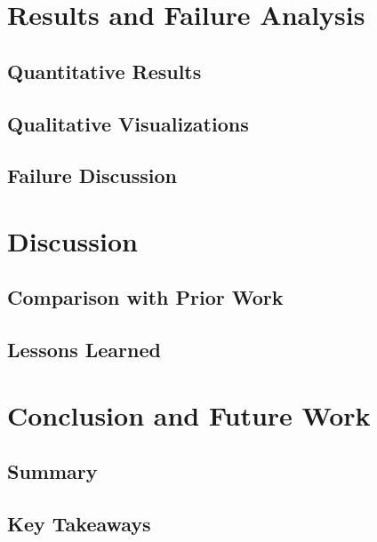 \documentclass[a4paper,12pt]{article}
\begin{document}
\section{Results and Failure Analysis}
\subsection{Quantitative Results}


\subsection{Qualitative Visualizations}


\subsection{Failure Discussion}


\section{Discussion}
\subsection{Comparison with Prior Work}

\subsection{Lessons Learned}

\section{Conclusion and Future Work}
\subsection{Summary}

\subsection{Key Takeaways}
\end{document}
